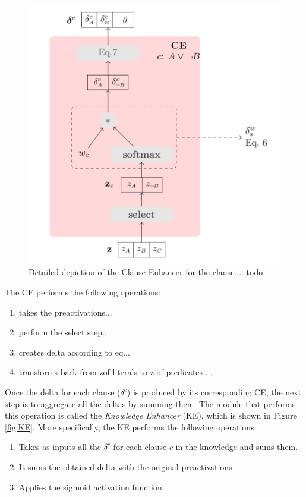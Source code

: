 \begin{figure}
	\centering
	\includegraphics[width=0.8\linewidth]{figures/CE.png}
	\caption{Detailed depiction of the Clause Enhancer for the clause.... todo}
	\label{fig:CE}
\end{figure}

The CE performs the following operations:
\begin{enumerate}
	\item takes the preactivations...
	\item perform the select step..
	\item creates delta according to eq...
	\item transforms back from zof literals to z of predicates ...
\end{enumerate}

Once the delta for each clause ($\delta^c$) is produced by its corresponding CE, the next step is to aggregate all the deltas by summing them. The module that performs this operation is called the \textit{Knowledge Enhancer} (KE), which is shown in Figure \ref{fig:KE}. More specifically, the KE performs the following operations:
\begin{enumerate}
	\item Takes as inputs all the $\delta^c$ for each clause $c$ in the knowledge and sums them. 
	\item It sums the obtained delta with the original preactivations 
	\item Applies the sigmoid activation function.
\end{enumerate}


